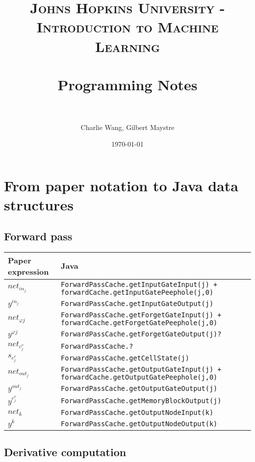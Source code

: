 \documentclass[paper=A4, fontsize=11pt]{scrartcl} %
\title{	
\normalfont \normalsize 
\textsc{Johns Hopkins University - Introduction to Machine Learning} \\ [25pt] %
\horrule{0.5pt} \\[0.4cm] %
\huge Programming Notes \\ %
\horrule{2pt} \\[0.5cm] %
}
\author{Charlie Wang, Gilbert Maystre} %
\date{\normalsize\today} %
\begin{document}
\maketitle %
\newpage

\section{From paper notation to Java data structures}

\subsection{Forward pass}

\begin{center}
\begin{tabular}{|l|l|} 
	\hline
 		Paper expression & Java\\ 
 	\hline
 	\hline
 		$net_{in_j}$ & \verb!ForwardPassCache.getInputGateInput(j) + forwardCache.getInputGatePeephole(j,0)! \\
 	\hline
  		$y^{in_j}$ & \verb!ForwardPassCache.getInputGateOutput(j)! \\ 
 	\hline
   		$net_{\varphi j}$ & \verb!ForwardPassCache.getForgetGateInput(j) + forwardCache.getForgetGatePeephole(j,0)! \\
 	\hline
   		$y^{\varphi j}$ & \verb!ForwardPassCache.getForgetGateOutput(j)?! \\ 
 	\hline
   		$net_{c_j^v}$ & \verb!ForwardPassCache.?! \\ 
 	\hline
   		$s_{c_j^v}$ & \verb!ForwardPassCache.getCellState(j)! \\ 
 	\hline
   		$net_{out_j}$ & \verb!ForwardPassCache.getOutputGateInput(j) + forwardCache.getOutputGatePeephole(j,0)! \\
 	\hline
   		$y^{out_j}$ & \verb!ForwardPassCache.getOutputGateOutput(j)! \\ 
 	\hline
   		$y^{c_j^v}$ & \verb!ForwardPassCache.getMemoryBlockOutput(j)! \\ 
 	\hline
   		$net_k$ & \verb!ForwardPassCache.getOutputNodeInput(k)! \\ 
 	\hline
   		$y^k$ & \verb!ForwardPassCache.getOutputNodeOutput(k)! \\ 
 	\hline
\end{tabular}
\end{center}

\subsection{Derivative computation}
\end{document}
